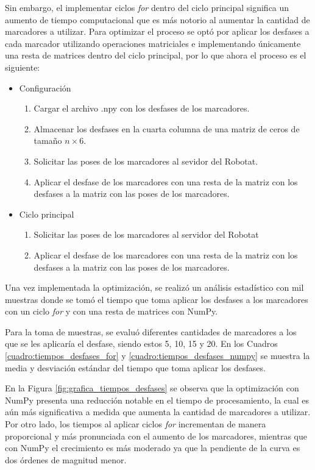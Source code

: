 Sin embargo, el implementar ciclos \textit{for} dentro del ciclo principal significa un aumento de tiempo computacional que es más notorio al aumentar la cantidad de marcadores a utilizar. Para optimizar el proceso se optó por aplicar los desfases a cada marcador utilizando operaciones matriciales e implementando únicamente una resta de matrices dentro del ciclo principal, por lo que ahora el proceso es el siguiente:

\begin{itemize}
	\item Configuración
	\begin{enumerate}
		\item Cargar el archivo .npy con los desfases de los marcadores.
		\item Almacenar los desfases en la cuarta columna de una matriz de ceros de tamaño $n \times 6$.
		\item Solicitar las poses de los marcadores al sevidor del Robotat.
		\item Aplicar el desfase de los marcadores con una resta de la matriz con los desfases a la matriz con las poses de los marcadores.
	\end{enumerate}
	\item Ciclo principal 
	\begin{enumerate}
		\item Solicitar las poses de los marcadores al servidor del Robotat
		\item Aplicar el desfase de los marcadores con una resta de la matriz con los desfases a la matriz con las poses de los marcadores.
	\end{enumerate}
\end{itemize}

Una vez implementada la optimización, se realizó un análisis estadístico con mil muestras donde se tomó el tiempo que toma aplicar los desfases a los marcadores con un ciclo \textit{for} y con una resta de matrices con NumPy.

Para la toma de muestras, se evaluó diferentes cantidades de marcadores a los que se les aplicaría el desfase, siendo estos 5, 10, 15 y 20. En los Cuadros \ref{cuadro:tiempos_desfases_for} y \ref{cuadro:tiempos_desfases_numpy} se muestra la media y desviación estándar del tiempo que toma aplicar los desfases.

En la Figura \ref{fig:grafica_tiempos_desfases} se observa que la optimización con NumPy presenta una reducción notable en el tiempo de procesamiento, la cual es aún más significativa a medida que aumenta la cantidad de marcadores a utilizar. Por otro lado, los tiempos al aplicar ciclos \textit{for} incrementan de manera proporcional y más pronunciada con el aumento de los marcadores, mientras que con NumPy el crecimiento es más moderado ya que la pendiente de la curva es dos órdenes de magnitud menor.

